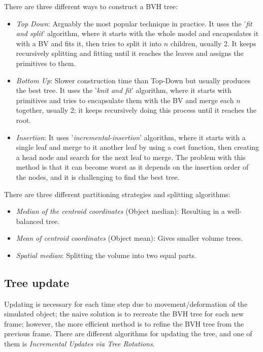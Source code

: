 \documentclass[11pt,a4paper]{article}
\begin{document}
	There are three different ways to construct a BVH tree:
	\begin{itemize}
		\item \textit{Top Down}:	Arguably the most popular technique in practice. It uses the '\textit{fit and split}' algorithm, where it starts with the whole model and encapsulates it with a BV and fits it, then tries to split it into $ n $ children, usually 2. It keeps recursively splitting and fitting until it reaches the leaves and assigns the primitives to them.
		
		\item \textit{Bottom Up}: Slower construction time than Top-Down but usually produces the best tree. It uses the '\textit{knit and fit}' algorithm, where it starts with primitives and tries to encapsulate them with the BV and merge each $ n $ together, usually 2; it keeps recursively doing this process until it reaches the root.
		
		
		\item \textit{Insertion}: It uses '\textit{incremental-insertion}' algorithm, where it starts with a single leaf and merge to it another leaf by using a cost function, then creating a head node and search for the next leaf to merge. The problem with this method is that it can become worst as it depends on the insertion order of the nodes, and it is challenging to find the best tree.
		
	\end{itemize} 
	
	
	
	There are three different partitioning strategies and splitting algorithms:
	\begin{itemize}
		\item \textit{Median of the centroid coordinates} (Object median): Resulting in a well-balanced tree.
		\item \textit{Mean of centroid coordinates} (Object mean): Gives smaller volume trees.
		\item \textit{Spatial median}: Splitting the volume into two equal parts.
		
	\end{itemize} 
	
	
	\subsection{Tree update}
	Updating is necessary for each time step due to movement/deformation of the simulated object; the naive solution is to recreate the BVH tree for each new frame; however, the more efficient method is to refine the BVH tree from the previous frame. There are different algorithms for updating the tree, and one of them is \textit{Incremental Updates via Tree Rotations}.
	
\end{document}
